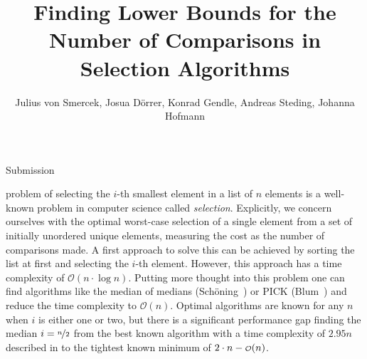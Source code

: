 \documentclass[10pt,journal,compsoc]{IEEEtran}
\newcommand\smallO{
  \mathchoice
    {{\scriptstyle\mathcal{O}}}%
    {{\scriptstyle\mathcal{O}}}%
    {{\scriptscriptstyle\mathcal{O}}}%
    {\scalebox{.50}{$\scriptscriptstyle\mathcal{O}$}}%
  }
\begin{document}
\title{Finding Lower Bounds for the Number of Comparisons in Selection Algorithms}
\author{Julius von Smercek, Josua Dörrer, Konrad Gendle, Andreas Steding, Johanna Hofmann%
  }

%
{Submission}



\maketitle

\IEEEdisplaynontitleabstractindextext


\IEEEpeerreviewmaketitle

  problem of selecting the $i$-th smallest element in a
list of $n$ elements is a well-known problem in computer science called
\textit{selection}. Explicitly, we concern ourselves with the optimal worst-case
selection of a single element from a set of initially unordered unique elements,
measuring the cost as the number of comparisons made. A first approach to solve
this can be achieved by sorting the list at first and selecting the $i$-th
element. However, this approach has a time complexity of $\mathcal{O}(n \cdot
  \log n)$. Putting more thought into this problem one can find algorithms like
the median of medians (Schöning~\cite{Schoening1993}) or PICK
(Blum~\cite{Blum1972}) and reduce the time complexity to $\mathcal{O}(n)$.
Optimal algorithms are known for any $n$ when $i$ is either one or two, but
there is a significant performance gap finding the median $i = \nicefrac{n}{2}$
from the best known algorithm with a time complexity of $2.95n$ described in
\cite{dor1999selecting} to the tightest known minimum of $2 \cdot n -
  \smallO(n)$.
\end{document}
